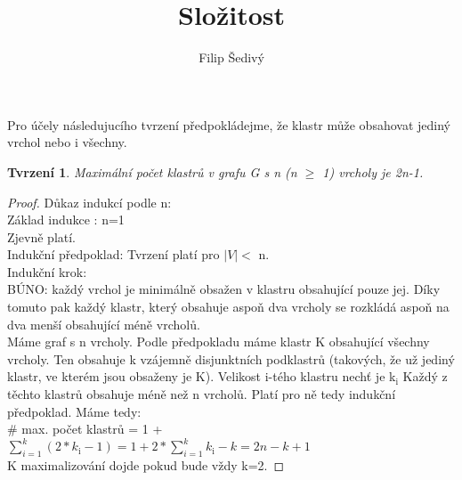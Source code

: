 \documentclass[12pt,a4report]{report}
\title {Složitost}
\newtheorem{tvr1}{Tvrzení}
\begin{document}
\author{Filip Šedivý}
\maketitle

Pro účely následujucího tvrzení předpokládejme, že klastr může obsahovat jediný vrchol nebo i všechny.
\begin{tvr1}
Maximální počet klastrů v grafu G s n (n $\geq$ 1) vrcholy je 2n-1.
\end{tvr1}
\begin{proof}
Důkaz indukcí podle n: \\
Základ indukce : n=1 \\
Zjevně platí. \\
Indukční předpoklad: Tvrzení platí pro $|V| <$ n.\\
Indukční krok:  \\
BÚNO: každý vrchol je minimálně obsažen v klastru obsahující pouze jej.
Díky tomuto pak každý klastr, který obsahuje aspoň dva vrcholy se rozkládá aspoň na dva menší obsahující méně vrcholů. \\
Máme graf s n vrcholy. Podle předpokladu máme klastr K obsahující všechny vrcholy. Ten obsahuje k vzájemně disjunktních podklastrů (takových, že už jediný klastr, ve kterém jsou obsaženy je K). Velikost i-tého klastru nechť je k$_{\text{i}}$ Každý z těchto klastrů obsahuje méně než n vrcholů. Platí pro ně tedy indukční předpoklad. Máme tedy: \\
$\#$ max. počet klastrů = 1 + $\sum\limits_{i=1}^k (2*k_{\text{i}}-1) = 1 + 2*\sum\limits_{i=1}^k k_{\text{i}} - k = 2n - k + 1 $\\
K maximalizování dojde pokud bude vždy k=2.
\end{proof}
\end{document}
